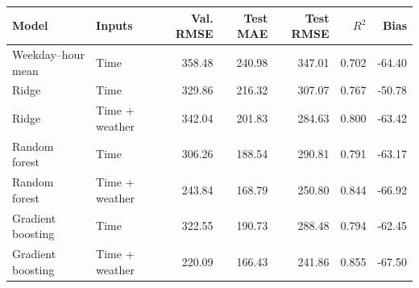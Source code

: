 \begin{tabular}{llrrrrr}
\toprule
Model & Inputs & Val. RMSE & Test MAE & Test RMSE & $R^2$ & Bias \\
\midrule
Weekday--hour mean & Time & 358.48 & 240.98 & 347.01 & 0.702 & -64.40 \\
Ridge & Time & 329.86 & 216.32 & 307.07 & 0.767 & -50.78 \\
Ridge & Time + weather & 342.04 & 201.83 & 284.63 & 0.800 & -63.42 \\
Random forest & Time & 306.26 & 188.54 & 290.81 & 0.791 & -63.17 \\
Random forest & Time + weather & 243.84 & 168.79 & 250.80 & 0.844 & -66.92 \\
Gradient boosting & Time & 322.55 & 190.73 & 288.48 & 0.794 & -62.45 \\
Gradient boosting & Time + weather & 220.09 & 166.43 & 241.86 & 0.855 & -67.50 \\
\bottomrule
\end{tabular}
